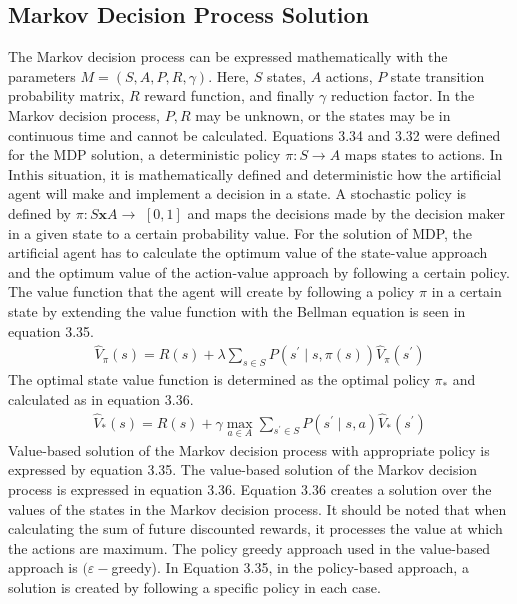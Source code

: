 \documentclass[12pt,twoside,a4]{mwbk}
\begin{document}
\subsection{Markov Decision Process Solution}
The Markov decision process can be expressed mathematically with the parameters $M=(S, A, P, R, \gamma)$. Here, $S$ states, $A$ actions, $P$ state transition probability matrix, $R$ reward function, and finally $\gamma$ reduction factor. In the Markov decision process, $P, R$ may be unknown, or the states may be in continuous time and cannot be calculated. Equations 3.34 and 3.32 were defined for the MDP solution, a deterministic policy $\pi:S \rightarrow A$ maps states to actions. In $\mathrm{In this}$ situation, it is mathematically defined and deterministic how the artificial agent will make and implement a decision in a state. A stochastic policy is defined by $\pi: S \boldsymbol{x} A \rightarrow$ $[0,1]$ and maps the decisions made by the decision maker in a given state to a certain probability value. For the solution of MDP, the artificial agent has to calculate the optimum value of the state-value approach and the optimum value of the action-value approach by following a certain policy. The value function that the agent will create by following a policy $\pi$ in a certain state by extending the value function with the Bellman equation is seen in equation 3.35.
\begin{subequations}
\begin{align}
   \widehat{V}_{\pi}(s)=R(s)+\lambda \sum_{s \in S} P\left(s^{\prime} \mid s, \pi(s)\right) \hat{V}_{\pi}\left(s^{\prime}\right)
\end{align}
\end{subequations}
The optimal state value function is determined as the optimal policy $\pi_{*}$ and calculated as in equation 3.36.
\begin{subequations}
\begin{align}
   \hat{V}_{*}(s)=R(s)+\gamma \max _{a \in A} \sum_{s^{\prime} \in S} P\left(s^{\prime} \mid s, a\right) \hat{V}_{*}\left(s^{\prime}\right)
\end{align}
\end{subequations}
Value-based solution of the Markov decision process with appropriate policy is expressed by equation 3.35. The value-based solution of the Markov decision process is expressed in equation 3.36. Equation 3.36 creates a solution over the values of the states in the Markov decision process. It should be noted that when calculating the sum of future discounted rewards, it processes the value at which the actions are maximum. The policy greedy approach used in the value-based approach is $(\varepsilon-$greedy). In Equation 3.35, in the policy-based approach, a solution is created by following a specific policy in each case. 
\end{document}
